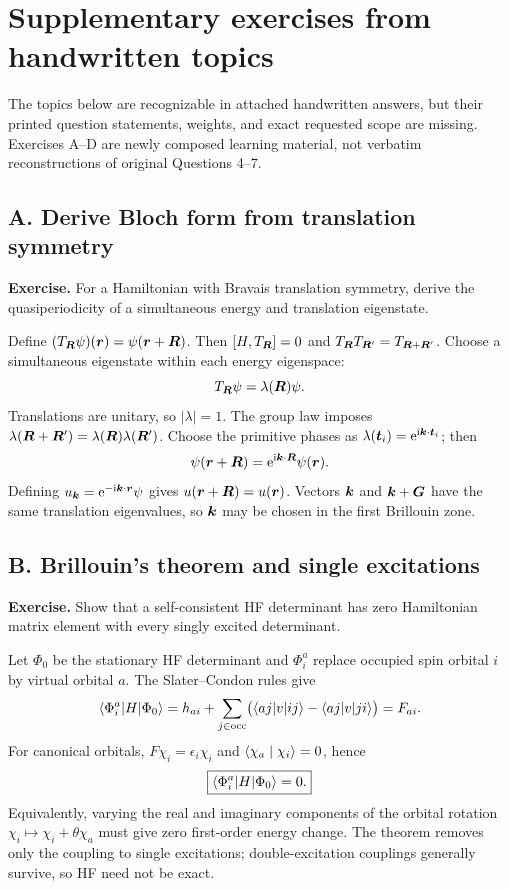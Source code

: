 \clearpage
\section*{Supplementary exercises from handwritten topics}
\begin{sourceNote}
The topics below are recognizable in attached handwritten answers, but their printed question statements, weights, and exact requested scope are missing. Exercises A--D are newly composed learning material, not verbatim reconstructions of original Questions 4--7.
\end{sourceNote}

\subsection*{A. Derive Bloch form from translation symmetry}
\textbf{Exercise.} For a Hamiltonian with Bravais translation symmetry, derive the quasiperiodicity of a simultaneous energy and translation eigenstate.

Define $(T_{\boldsymbol{R}}\psi)(\boldsymbol{r})=\psi(\boldsymbol{r}+\boldsymbol{R})$. Then $[H,T_{\boldsymbol{R}}]=0$ and $T_{\boldsymbol{R}}T_{\boldsymbol{R}'}=T_{\boldsymbol{R}+\boldsymbol{R}'}$. Choose a simultaneous eigenstate within each energy eigenspace:
\[
T_{\boldsymbol{R}}\psi=\lambda(\boldsymbol{R})\psi.
\]
Translations are unitary, so $|\lambda|=1$. The group law imposes $\lambda(\boldsymbol{R}+\boldsymbol{R}')=\lambda(\boldsymbol{R})\lambda(\boldsymbol{R}')$. Choose the primitive phases as $\lambda(\boldsymbol{t}_i)=\mathrm{e}^{\mathrm{i}\boldsymbol{k}\cdot\boldsymbol{t}_i}$; then
\[
\psi(\boldsymbol{r}+\boldsymbol{R})=\mathrm{e}^{\mathrm{i}\boldsymbol{k}\cdot\boldsymbol{R}}\psi(\boldsymbol{r}).
\]
Defining $u_{\boldsymbol{k}}=\mathrm{e}^{-\mathrm{i}\boldsymbol{k}\cdot\boldsymbol{r}}\psi$ gives $u(\boldsymbol{r}+\boldsymbol{R})=u(\boldsymbol{r})$. Vectors $\boldsymbol{k}$ and $\boldsymbol{k}+\boldsymbol{G}$ have the same translation eigenvalues, so $\boldsymbol{k}$ may be chosen in the first Brillouin zone.

\subsection*{B. Brillouin's theorem and single excitations}
\textbf{Exercise.} Show that a self-consistent HF determinant has zero Hamiltonian matrix element with every singly excited determinant.

Let $\Phi_0$ be the stationary HF determinant and $\Phi_i^a$ replace occupied spin orbital $i$ by virtual orbital $a$. The Slater--Condon rules give
\[
\langle\Phi_i^a\rvert H\lvert\Phi_0\rangle
=h_{ai}+\sum_{j\in\mathrm{occ}}
\bigl(\langle aj|v|ij\rangle-\langle aj|v|ji\rangle\bigr)=F_{ai}.
\]
For canonical orbitals, $F\chi_i=\epsilon_i\chi_i$ and $\langle\chi_a\mid\chi_i\rangle=0$, hence
\[
\boxed{\langle\Phi_i^a\rvert H\lvert\Phi_0\rangle=0.}
\]
Equivalently, varying the real and imaginary components of the orbital rotation $\chi_i\mapsto\chi_i+\theta\chi_a$ must give zero first-order energy change. The theorem removes only the coupling to single excitations; double-excitation couplings generally survive, so HF need not be exact.

